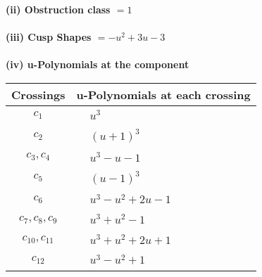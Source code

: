 \documentclass[1p]{elsarticle_modified}
\theoremstyle{definition}
\begin{document}
\flushleft \textbf{(ii) Obstruction class $= 1$}\\~\\
\flushleft \textbf{(iii) Cusp Shapes $= - u^2+3 u-3$}\\~\\
\newpage\renewcommand{\arraystretch}{1}
\flushleft \textbf{(iv) u-Polynomials at the component}\newline \\
\begin{tabular}{m{50pt}|m{274pt}}
Crossings & \hspace{64pt}u-Polynomials at each crossing \\
\hline $$\begin{aligned}c_{1}\end{aligned}$$&$\begin{aligned}
&u^3
\end{aligned}$\\
\hline $$\begin{aligned}c_{2}\end{aligned}$$&$\begin{aligned}
&(u+1)^3
\end{aligned}$\\
\hline $$\begin{aligned}c_{3},c_{4}\end{aligned}$$&$\begin{aligned}
&u^3- u-1
\end{aligned}$\\
\hline $$\begin{aligned}c_{5}\end{aligned}$$&$\begin{aligned}
&(u-1)^3
\end{aligned}$\\
\hline $$\begin{aligned}c_{6}\end{aligned}$$&$\begin{aligned}
&u^3- u^2+2 u-1
\end{aligned}$\\
\hline $$\begin{aligned}c_{7},c_{8},c_{9}\end{aligned}$$&$\begin{aligned}
&u^3+u^2-1
\end{aligned}$\\
\hline $$\begin{aligned}c_{10},c_{11}\end{aligned}$$&$\begin{aligned}
&u^3+u^2+2 u+1
\end{aligned}$\\
\hline $$\begin{aligned}c_{12}\end{aligned}$$&$\begin{aligned}
&u^3- u^2+1
\end{aligned}$\\
\hline
\end{tabular}\\~\\
\end{document}
